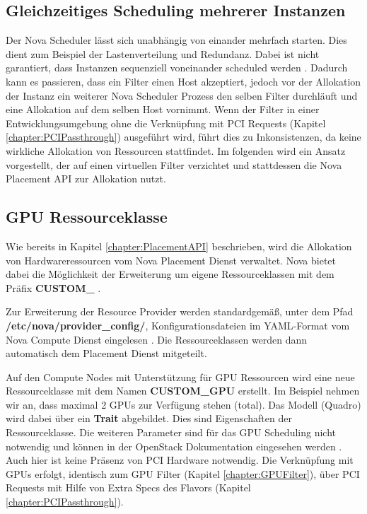 \documentclass[../Main.tex]{subfiles}
\begin{document}
\subsection{Gleichzeitiges Scheduling mehrerer Instanzen}

Der Nova Scheduler lässt sich unabhängig von einander mehrfach starten. Dies dient zum Beispiel der Lastenverteilung
und Redundanz. Dabei ist nicht garantiert, dass Instanzen sequenziell voneinander scheduled werden \citep{NovaScheduling}.
Dadurch kann es passieren, dass ein Filter einen Host akzeptiert, jedoch vor der Allokation der Instanz ein weiterer Nova Scheduler Prozess den selben
Filter durchläuft und eine Allokation auf dem selben Host vornimmt. Wenn der Filter in einer Entwicklungsumgebung
ohne die Verknüpfung mit PCI Requests (Kapitel \ref{chapter:PCIPassthrough}) ausgeführt wird, führt dies zu
Inkonsistenzen, da keine wirkliche Allokation von Ressourcen stattfindet. Im folgenden wird ein Ansatz vorgestellt, der auf einen virtuellen Filter verzichtet und stattdessen die Nova Placement API
zur Allokation nutzt.

\subsection{GPU Ressourceklasse}
\label{chapter:GPUResourceClass}

Wie bereits in Kapitel \ref{chapter:PlacementAPI} beschrieben, wird die Allokation von Hardwareressourcen vom Nova Placement
Dienst verwaltet. Nova bietet dabei die Möglichkeit der Erweiterung um eigene Ressourceklassen mit dem Präfix \textbf{CUSTOM\_} \citep{NovaCustomResourceClasses}.

Zur Erweiterung der Resource Provider werden standardgemä{\ss}, unter dem Pfad \textbf{/etc/nova/provider\_config/}, Konfigurationsdateien im YAML-Format vom Nova Compute Dienst 
eingelesen \citep{NovaConfigurationOptions}. Die Ressourceklassen werden dann
automatisch dem Placement Dienst mitgeteilt.

Auf den Compute Nodes mit Unterstützung für GPU Ressourcen wird eine neue Ressourceklasse mit dem Namen \textbf{CUSTOM\_GPU} erstellt. Im Beispiel
nehmen wir an, dass maximal 2 GPUs zur Verfügung stehen (total). Das Modell (Quadro) wird dabei über
ein \textbf{Trait} abgebildet. Dies sind Eigenschaften der Ressourceklasse. Die weiteren Parameter sind für das GPU Scheduling nicht notwendig und können
in der OpenStack Dokumentation eingesehen werden \citep{ProviderConfigFile}. Auch hier ist keine Präsenz von
PCI Hardware notwendig. Die Verknüpfung mit GPUs erfolgt, identisch zum GPU Filter (Kapitel \ref{chapter:GPUFilter}), über PCI Requests mit Hilfe von
Extra Specs des Flavors (Kapitel \ref{chapter:PCIPassthrough}).
\end{document}
